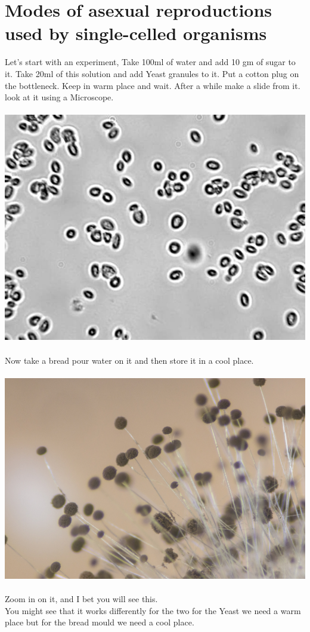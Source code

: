 \documentclass[A4]{article}
\begin{document}
     \section{Modes of asexual reproductions used by single-celled organisms}
    Let's start with an experiment, Take 100ml of water and add 10 gm of sugar to it. 
    Take 20ml of this solution and add Yeast granules to it. Put a cotton plug on the bottleneck. Keep in warm place and wait.
    After a while make a slide from it. \\ look at it using a Microscope. \\ \\
     \includegraphics[scale=0.25]{Yeast-Under-Microscope.jpg} \\ \\
     Now take a bread pour water on it and then store it in a cool place. \\ \\
     \includegraphics[scale=0.15]{bread-mould-fungus.jpg} \\ \\
     Zoom in on it, and I bet you will see this.  \\
     You might see that it works differently for the two for the Yeast we need a warm place but for the bread mould we need a cool place.
\end{document}
